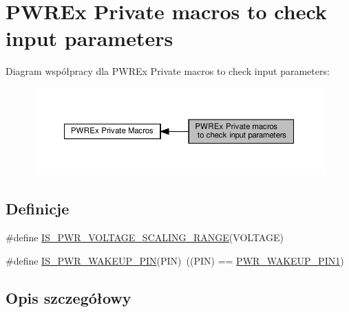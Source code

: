 \hypertarget{group___p_w_r_ex___i_s___p_w_r___definitions}{}\section{P\+W\+R\+Ex Private macros to check input parameters}
\label{group___p_w_r_ex___i_s___p_w_r___definitions}
Diagram współpracy dla P\+W\+R\+Ex Private macros to check input parameters\+:\nopagebreak
\begin{figure}[H]
\begin{center}
\leavevmode
\includegraphics[width=350pt]{group___p_w_r_ex___i_s___p_w_r___definitions}
\end{center}
\end{figure}
\subsection*{Definicje}
\begin{DoxyCompactItemize}
\item 
\#define \hyperlink{group___p_w_r_ex___i_s___p_w_r___definitions_ga007e15203cc13b9f50824ffc103e0a5c}{I\+S\+\_\+\+P\+W\+R\+\_\+\+V\+O\+L\+T\+A\+G\+E\+\_\+\+S\+C\+A\+L\+I\+N\+G\+\_\+\+R\+A\+N\+GE}(V\+O\+L\+T\+A\+GE)
\item 
\#define \hyperlink{group___p_w_r_ex___i_s___p_w_r___definitions_gac6fcc59d6ff95b8feda1b228517f9c3f}{I\+S\+\_\+\+P\+W\+R\+\_\+\+W\+A\+K\+E\+U\+P\+\_\+\+P\+IN}(P\+IN)~((P\+IN) == \hyperlink{group___p_w_r___wake_up___pins_ga0da8e7cbe0826e93b777ae4419a1cd05}{P\+W\+R\+\_\+\+W\+A\+K\+E\+U\+P\+\_\+\+P\+I\+N1})
\end{DoxyCompactItemize}


\subsection{Opis szczegółowy}


